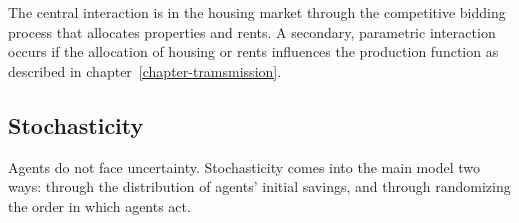 The central interaction is in the housing market through the competitive bidding process that allocates properties and rents.  A secondary, parametric interaction occurs if the allocation of housing or rents influences the production function as described in chapter~\ref{chapter-tramsmission}.

\subsection{Stochasticity}
Agents do not face uncertainty. Stochasticity comes into the main model two ways: through the distribution of agents' initial savings, and through randomizing the order in which agents act. 


